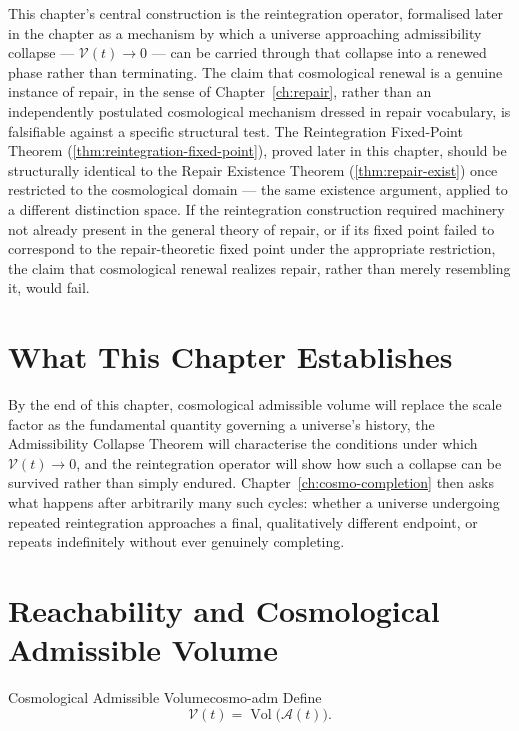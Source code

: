 \documentclass[12pt,twoside,openright]{book}
\newcommand{\Vol}{\operatorname{Vol}}
\begin{document}
This chapter's central construction is the reintegration
operator, formalised later in the chapter as a mechanism by
which a universe approaching admissibility collapse ---
$\mathcal{V}(t)\to0$ --- can be carried through that collapse
into a renewed phase rather than terminating. The claim that
cosmological renewal is a genuine instance of repair, in the
sense of Chapter~\ref{ch:repair}, rather than an independently
postulated cosmological mechanism dressed in repair
vocabulary, is falsifiable against a specific structural test.
The Reintegration Fixed-Point Theorem
(\cref{thm:reintegration-fixed-point}), proved later in this
chapter, should be structurally identical to the Repair
Existence Theorem (\cref{thm:repair-exist}) once restricted to
the cosmological domain --- the same existence argument,
applied to a different distinction space. If the reintegration
construction required machinery not already present in the
general theory of repair, or if its fixed point failed to
correspond to the repair-theoretic fixed point under the
appropriate restriction, the claim that cosmological renewal
realizes repair, rather than merely resembling it, would fail.

\section{What This Chapter Establishes}
\label{sec:ch18-preview}

By the end of this chapter, cosmological admissible volume
will replace the scale factor as the fundamental quantity
governing a universe's history, the Admissibility Collapse
Theorem will characterise the conditions under which
$\mathcal{V}(t)\to0$, and the reintegration operator will show
how such a collapse can be survived rather than simply
endured. Chapter~\ref{ch:cosmo-completion} then asks what
happens after arbitrarily many such cycles: whether a universe
undergoing repeated reintegration approaches a final,
qualitatively different endpoint, or repeats indefinitely
without ever genuinely completing.

\section{Reachability and Cosmological Admissible Volume}
\label{sec:ch18-replaces-defs}

\begin{definition}{Cosmological Admissible Volume}{cosmo-adm}
  Define
  \[
    \mathcal{V}(t) = \Vol\bigl(\mathcal{A}(t)\bigr).
  \]
\end{definition}
\end{document}
